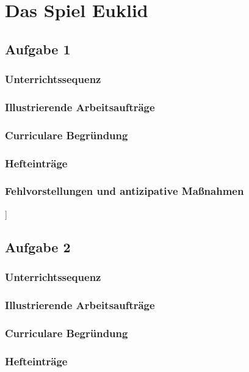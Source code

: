 \chapter{Das Spiel Euklid}\label{chap3}
%
\section{Aufgabe 1}
\subsection{Unterrichtssequenz}
\subsection{Illustrierende Arbeitsaufträge}
\subsection{Curriculare Begründung}
\subsection{Hefteinträge}
\subsection{Fehlvorstellungen und antizipative Maßnahmen}]
\section{Aufgabe 2}
\subsection{Unterrichtssequenz}
\subsection{Illustrierende Arbeitsaufträge}
\subsection{Curriculare Begründung}
\subsection{Hefteinträge}
